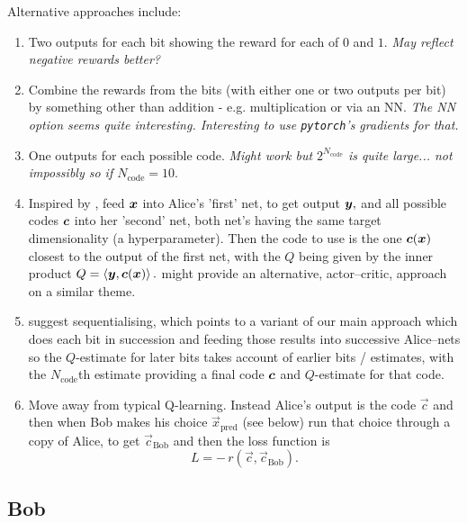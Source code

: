 \documentclass[12pt]{article}
\begin{document}
Alternative approaches include:
\begin{enumerate}
	\item Two outputs for each bit showing the reward for each of $0$ and $1.$  {\em May reflect negative rewards better?}
	
	\item Combine the rewards from the bits (with either one or two outputs per bit) by something other than addition - e.g. multiplication or via an NN. {\em The NN option seems quite interesting.  Interesting to use \verb|pytorch|'s gradients for that.}
	
	\item One outputs for each possible code. {\em Might work but $2^{N_\text{code}}$ is quite large... not impossibly so if $N_\text{code}=10.$}
	
	\item Inspired by , feed $\boldsymbol{x}$ into Alice's 'first' net, to get output $\boldsymbol{y},$ and all possible codes $\boldsymbol{c}$ into her 'second' net, both net's having the same target dimensionality (a hyperparameter).  Then the code to use is the one $\boldsymbol{c}(\boldsymbol{x})$ closest to the output of the first net, with the $Q$ being given by the inner product $Q = \left\langle \boldsymbol{y}, \boldsymbol{c}(\boldsymbol{x}) \right\rangle.$   might provide an alternative, actor--critic, approach on a similar theme.
	
	\item {} suggest sequentialising, which points to a variant of our main approach which does each bit in succession and feeding those results into successive Alice--nets so the $Q$-estimate for later bits takes account of earlier bits / estimates, with the $N_\text{code}$th estimate providing a final code $\boldsymbol{c}$ and $Q$-estimate for that code.
	
	\item Move away from typical Q-learning.  Instead Alice's output is the code $\vec{c}$ and then when Bob makes his choice $\vec{x}_\text{pred}$ (see below) run that choice through a copy of Alice, to get $\vec{c}_\text{Bob}$ and then the loss function is
	\begin{equation}
		L
		=
		-\,
		r(\vec{c}, \vec{c}_\text{Bob})
		.
	\end{equation}
\end{enumerate}

\subsection{Bob}
\end{document}
